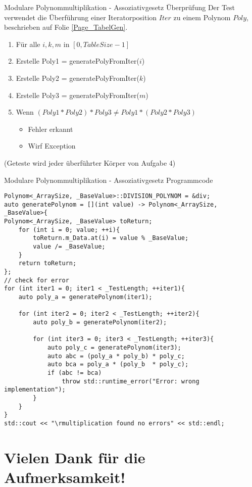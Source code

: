 \documentclass{beamer}
\begin{document}
\begin{frame}{Modulare Polynommultiplikation - \newline Assoziativgesetz Überprüfung}
	Der Test verwendet die Überführung einer Iteratorposition $Iter$ zu einem Polynom $Poly$, beschrieben auf Folie \ref*{Page_TabelGen}.
	\begin{enumerate}
		\item Für alle $i, k, m$ in $[0, TableSize - 1]$
		\item Erstelle Poly1 = generatePolyFromIter($i$)
		\item Erstelle Poly2 = generatePolyFromIter($k$)
		\item Erstelle Poly3 = generatePolyFromIter($m$)
		\item Wenn $(Poly1 * Poly2) * Poly3 \neq Poly1 * (Poly2 * Poly3)$
		\begin{itemize}
			\item Fehler erkannt
			\item Wirf Exception
		\end{itemize}
	\end{enumerate}
	(Geteste wird jeder überführter Körper von Aufgabe 4)
\end{frame}

\begin{frame}[fragile]{Modulare Polynommultiplikation - \newline Assoziativgesetz Programmcode}
	\begin{lstlisting}[style=numbers]
Polynom<_ArraySize, _BaseValue>::DIVISION_POLYNOM = &div;
auto generatePolynom = [](int value) -> Polynom<_ArraySize, _BaseValue>{
Polynom<_ArraySize, _BaseValue> toReturn;
    for (int i = 0; value; ++i){
        toReturn.m_Data.at(i) = value % _BaseValue;
        value /= _BaseValue;
    }
    return toReturn;
};
// check for error
for (int iter1 = 0; iter1 < _TestLength; ++iter1){
    auto poly_a = generatePolynom(iter1);

    for (int iter2 = 0; iter2 < _TestLength; ++iter2){
        auto poly_b = generatePolynom(iter2);

        for (int iter3 = 0; iter3 < _TestLength; ++iter3){
            auto poly_c = generatePolynom(iter3);
            auto abc = (poly_a * poly_b) * poly_c;
            auto bca = poly_a * (poly_b  * poly_c);
            if (abc != bca)
                throw std::runtime_error("Error: wrong implementation");
        }
    }
}
std::cout << "\rmultiplication found no errors" << std::endl;
\end{lstlisting}
\end{frame}

\section*{Vielen Dank für die Aufmerksamkeit!}
  
\end{document}
